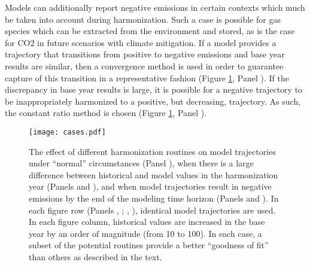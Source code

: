 Models can additionally report negative emissions in certain contexts which much
be taken into account during harmonization. Such a case is possible for gas
species which can be extracted from the environment and stored, as is the case
for CO2 in future scenarios with climate mitigation. If a model provides a
trajectory that transitions from positive to negative emissions and base year
results are similar, then a convergence method is used in order to guarantee
capture of this transition in a representative fashion (Figure \ref{fig:cases},
Panel ). If the discrepancy in base year results is large, it is
possible for a negative trajectory to be inappropriately harmonized to a
positive, but decreasing, trajectory. As such, the constant ratio method is
chosen (Figure \ref{fig:cases}, Panel ).

\begin{figure}
  \begin{center}
    \texttt{[image: cases.pdf]}
    \caption[]{
      \label{fig:cases}
      The effect of different harmonization routines on model trajectories under
      ``normal'' circumstances (Panel ), when there is a large
      difference between historical and model values in the harmonization year
      (Panels  and ), and when model trajectories result in
      negative emissions by the end of the modeling time horizon (Panels
       and ). In each figure row (Panels , ;
      , ), identical model trajectories are used. In each figure
      column, historical values are increased in the base year by an order of
      magnitude (from 10 to 100). In each case, a subset of the potential
      routines provide a better ``goodness of fit'' than others as described in
      the text.  }
  \end{center}
\end{figure}

